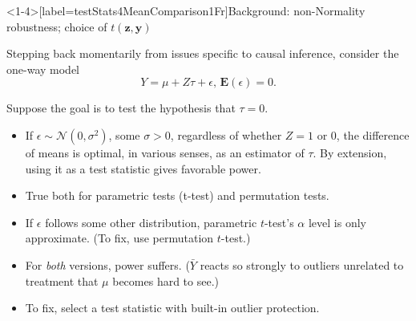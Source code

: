 
\begin{frame}<1-4\mynoteonly>[label=testStats4MeanComparison1Fr]{Background:
    non-Normality robustness; choice of $t(\mathbf{z}, \mathbf{y})$}

Stepping back momentarily from issues specific to causal inference, consider the one-way model
$$
Y = \mu + Z\tau + \epsilon,\, \mathbf{E}(\epsilon) = 0.
$$

Suppose the goal is to test the hypothesis that $\tau = 0$.
  
\begin{itemize}[<+->]
\item If $\epsilon \sim \mathcal{N}(0, \sigma^{2})$, some $\sigma >0$, regardless of whether $Z=1$ or 0, the difference of means is optimal, in various senses, as an estimator of $\tau$. By extension, using it as a test statistic gives favorable power.
\item True both for parametric tests (t-test) and permutation tests.
\item If $\epsilon$ follows some other distribution, parametric
  $t$-test's $\alpha$ level is only approximate.  (To
  fix, use permutation $t$-test.)
\item For \textit{both} versions, {power} suffers. ($\bar{Y}$ reacts so
  strongly to outliers unrelated to treatment that  $\mu$ becomes
  hard to see.)
\item To fix, select a test statistic with built-in outlier
  protection.
\end{itemize}
\end{frame}


